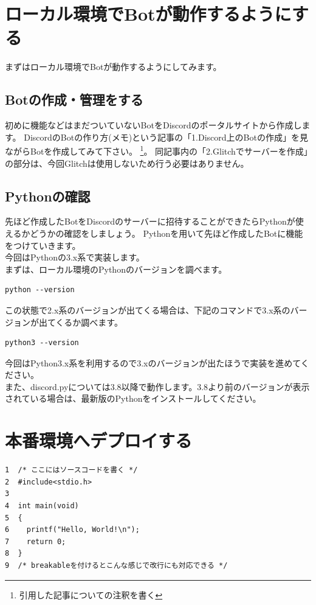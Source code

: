 \section{ローカル環境でBotが動作するようにする}
まずはローカル環境でBotが動作するようにしてみます。

\subsection{Botの作成・管理をする}
初めに機能などはまだついていないBotをDiscordのポータルサイトから作成します。
DiscordのBotの作り方(メモ)という記事の「1.Discord上のBotの作成」を見ながらBotを作成してみて下さい。
\footnote{引用した記事についての注釈を書く}。
同記事内の「2.Glitchでサーバーを作成」の部分は、今回Glitchは使用しないため行う必要はありません。

\subsection{Pythonの確認}
先ほど作成したBotをDiscordのサーバーに招待することができたらPythonが使えるかどうかの確認をしましょう。
Pythonを用いて先ほど作成したBotに機能をつけていきます。\\
今回はPythonの3.x系で実装します。\\
まずは、ローカル環境のPythonのバージョンを調べます。\\
\begin{shaded}
\begin{verbatim}
python --version
\end{verbatim}
\end{shaded}
この状態で2.x系のバージョンが出てくる場合は、下記のコマンドで3.x系のバージョンが出てくるか調べます。
\begin{shaded}
\begin{verbatim}
python3 --version
\end{verbatim}
\end{shaded}
今回はPython3.x系を利用するので3.xのバージョンが出たほうで実装を進めてください。\\
また、discord.pyについては3.8以降で動作します。3.8より前のバージョンが表示されている場合は、最新版のPythonをインストールしてください。

\section{本番環境へデプロイする}

\begin{tcolorbox}[breakable]
\begin{verbatim}
1  /* ここにはソースコードを書く */
2  #include<stdio.h>
3
4  int main(void)
5  {
6    printf("Hello, World!\n");
7    return 0;
8  }
9  /* breakableを付けるとこんな感じで改行にも対応できる */
\end{verbatim}
\end{tcolorbox}

